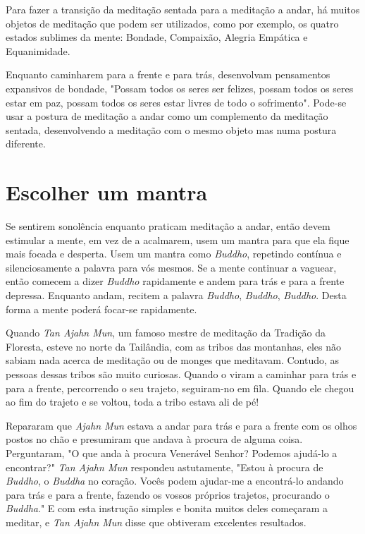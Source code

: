 Para fazer a transição da meditação sentada para a meditação a andar, há
muitos objetos de meditação que podem ser utilizados, como por exemplo,
os quatro estados sublimes da mente: Bondade, Compaixão, Alegria
Empática e Equanimidade.

Enquanto caminharem para a frente e para trás, desenvolvam pensamentos
expansivos de bondade, "Possam todos os seres ser felizes, possam todos
os seres estar em paz, possam todos os seres estar livres de todo o
sofrimento". Pode-se usar a postura de meditação a andar como um
complemento da meditação sentada, desenvolvendo a meditação com o mesmo
objeto mas numa postura diferente.

\section{Escolher um mantra}

Se sentirem sonolência enquanto praticam meditação a andar, então devem
estimular a mente, em vez de a acalmarem, usem um mantra para que ela
fique mais focada e desperta. Usem um mantra como \emph{Buddho},
repetindo contínua e silenciosamente a palavra para vós mesmos. Se a
mente continuar a vaguear, então comecem a dizer \emph{Buddho}
rapidamente e andem para trás e para a frente depressa. Enquanto andam,
recitem a palavra \emph{Buddho}, \emph{Buddho}, \emph{Buddho}. Desta
forma a mente poderá focar-se rapidamente.

Quando \emph{Tan Ajahn Mun}, um famoso mestre de meditação da Tradição
da Floresta, esteve no norte da Tailândia, com as tribos das montanhas,
eles não sabiam nada acerca de meditação ou de monges que meditavam.
Contudo, as pessoas dessas tribos são muito curiosas. Quando o viram a
caminhar para trás e para a frente, percorrendo o seu trajeto,
seguiram-no em fila. Quando ele chegou ao fim do trajeto e se voltou,
toda a tribo estava ali de pé!

Repararam que \emph{Ajahn Mun} estava a andar para trás e para a frente
com os olhos postos no chão e presumiram que andava à procura de alguma
coisa. Perguntaram, "O que anda à procura Venerável Senhor? Podemos
ajudá-lo a encontrar?" \emph{Tan Ajahn Mun} respondeu astutamente,
"Estou à procura de \emph{Buddho}, o \emph{Buddha} no coração. Vocês
podem ajudar-me a encontrá-lo andando para trás e para a frente, fazendo
os vossos próprios trajetos, procurando o \emph{Buddha}." E com esta
instrução simples e bonita muitos deles começaram a meditar, e \emph{Tan
Ajahn Mun} disse que obtiveram excelentes resultados.

